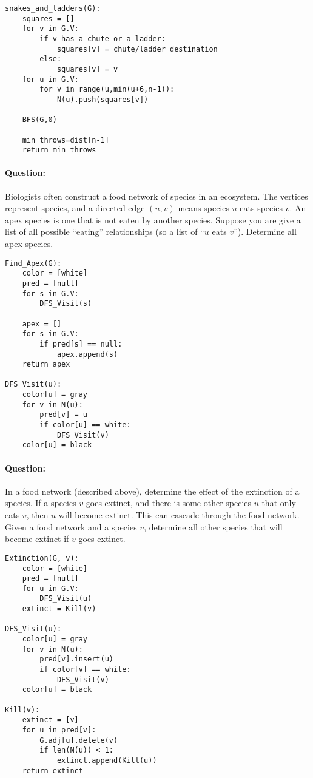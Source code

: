 \documentclass{article}
\begin{document}
\begin{lstlisting}
snakes_and_ladders(G):
    squares = []
    for v in G.V:
        if v has a chute or a ladder:
            squares[v] = chute/ladder destination
        else:
            squares[v] = v
    for u in G.V:
        for v in range(u,min(u+6,n-1)):
            N(u).push(squares[v])
    
    BFS(G,0)

    min_throws=dist[n-1]
    return min_throws
\end{lstlisting}

\paragraph{Question:} Biologists often construct a food network of species in an ecosystem. The vertices represent species, and a directed edge \((u, v)\) means species \(u\) eats species \(v\). An apex species is one that is not eaten by another species. Suppose you are give a list of all possible “eating” relationships (so a list of “\(u\) eats \(v\)”). Determine all apex species. 

\begin{lstlisting}
Find_Apex(G):
    color = [white]
    pred = [null]
    for s in G.V:
        DFS_Visit(s)
    
    apex = []
    for s in G.V:
        if pred[s] == null:
            apex.append(s)
    return apex

DFS_Visit(u):
    color[u] = gray
    for v in N(u):
        pred[v] = u
        if color[u] == white:
            DFS_Visit(v)
    color[u] = black
\end{lstlisting}

\paragraph{Question:} In a food network (described above), determine the effect of the extinction of a species. If a species \(v\) goes extinct, and there is some other species \(u\) that only eats \(v\), then \(u\) will become extinct. This can cascade through the food network. Given a food network and a species \(v\), determine all other species that will become extinct if \(v\) goes extinct.

\begin{lstlisting}
Extinction(G, v):
    color = [white]
    pred = [null]
    for u in G.V:
        DFS_Visit(u)
    extinct = Kill(v)

DFS_Visit(u):
    color[u] = gray
    for v in N(u):
        pred[v].insert(u)
        if color[v] == white:
            DFS_Visit(v)
    color[u] = black

Kill(v):
    extinct = [v]
    for u in pred[v]:
        G.adj[u].delete(v)
        if len(N(u)) < 1:
            extinct.append(Kill(u))
    return extinct
\end{lstlisting}
\end{document}
